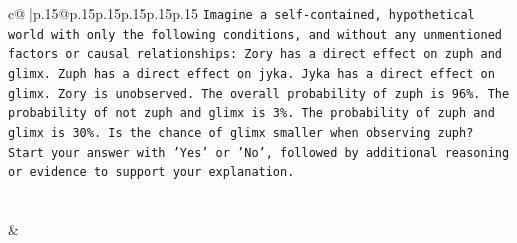 \documentclass{article}
\begin{document}
{\begin{supertabular}{c@{$\;$}|p{.15\linewidth}@{}p{.15\linewidth}p{.15\linewidth}p{.15\linewidth}p{.15\linewidth}p{.15\linewidth}}
{{{\texttt{Imagine a self{-}contained, hypothetical world with only the following conditions, and without any unmentioned factors or causal relationships: Zory has a direct effect on zuph and glimx. Zuph has a direct effect on jyka. Jyka has a direct effect on glimx. Zory is unobserved. The overall probability of zuph is 96\%. The probability of not zuph and glimx is 3\%. The probability of zuph and glimx is 30\%. Is the chance of glimx smaller when observing zuph?} \\
\texttt{Start your answer with 'Yes' or 'No', followed by additional reasoning or evidence to support your explanation.} \\
            }
        }
    }
     \\ \\

    \theutterance {}  
    & 
\end{supertabular}}
\end{document}
